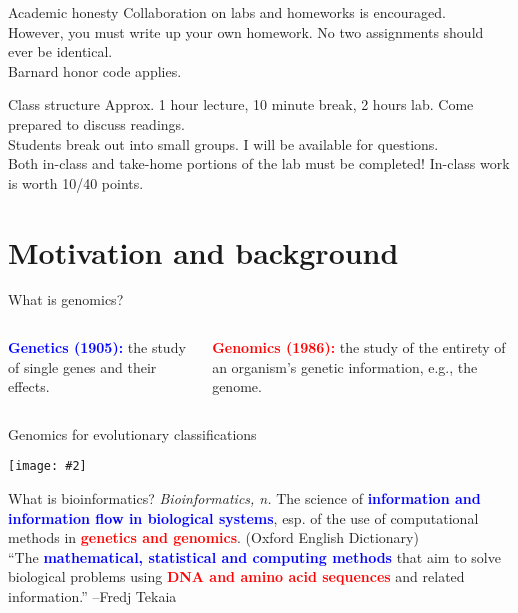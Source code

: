 \documentclass{beamer}
\renewcommand{\c}[1]{\begin{center}#1\end{center}}
\newcommand{\blu}[1]{\textcolor{blue}{\textbf{#1}}}
\newcommand{\red}[1]{\textcolor{red}{\textbf{#1}}}
\newcommand{\gr}[2][.95]{\c{\texttt{[image: \#2]}}}
\begin{document}
\begin{frame}{Academic honesty}
Collaboration on labs and homeworks is encouraged.\\
\bigskip
However, you must write up your own homework. No two assignments should ever be identical.\\
\bigskip
Barnard honor code applies.
\end{frame}

\begin{frame}{Class structure}
Approx. 1 hour lecture, 10 minute break, 2 hours lab. Come prepared to discuss readings. \\
\bigskip
Students break out into small groups. I will be available for questions.\\
\bigskip
Both in-class and take-home portions of the lab must be completed! In-class work is worth 10/40 points.
\end{frame}

\section{Motivation and background}


\begin{frame}{What is genomics?}
\begin{columns}[t]
\begin{column}{0.5\textwidth}
    \blu{Genetics (1905):} the study of single genes and their effects.
    \fbox{\gr{l1_figs/s3_tree.png}}
    \end{column}
\begin{column}{0.5\textwidth}
    \red{Genomics (1986):} the study of the entirety of an organism's genetic information, e.g., the genome.
    \fbox{\gr{l1_figs/s3_genome.png}}
    \end{column}
\end{columns}
\end{frame}

\begin{frame}{Genomics for evolutionary classifications}
\gr{l1_figs/s4_related.png}
\end{frame}

\begin{frame}{What is bioinformatics?}
\textit{Bioinformatics, n.} The science of \blu{information and information flow in biological systems}, esp. of the use of computational methods in \red{genetics and genomics}. (Oxford English Dictionary)\\
\bigskip
``The \blu{mathematical, statistical and computing methods} that aim to solve biological problems using \red{DNA and amino acid sequences} and related information.'' --Fredj Tekaia
\end{frame}
\end{document}
